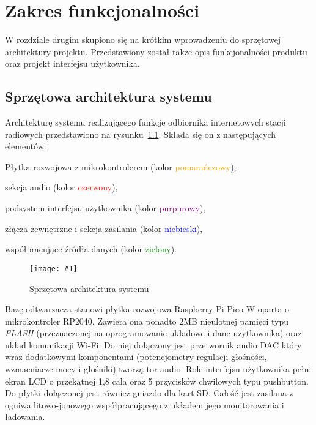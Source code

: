\documentclass[polish]{aghengthesis}
\let\tempone\itemize
\let\temptwo\enditemize
\renewenvironment{itemize}{\tempone\setlength{\itemsep}{0cm}}{\temptwo}
\newcommand{\imgint}[4]{
	\begin{figure}[{#4}]
		\centering
		\texttt{[image: \#1]}
		\caption{#2}
		\label{#1}
	\end{figure}
}
\newcommand{\imgh}[3]{\imgint{#1}{#2}{#3}{H}}
\begin{document}
\chapter{Zakres funkcjonalności}
	W rozdziale drugim skupiono się na krótkim wprowadzeniu do sprzętowej architektury projektu. Przedstawiony został także opis funkcjonalności produktu oraz projekt interfejsu użytkownika.\\
	
	\section{Sprzętowa architektura systemu}
			Architekturę systemu realizującego funkcje odbiornika internetowych stacji radiowych przedstawiono na rysunku~\ref{2/PicoRadio-hw-blocks}. Składa się on z następujących elementów:
			\begin{itemize}
				\item Płytka rozwojowa z mikrokontrolerem (kolor \textcolor{orange}{pomarańczowy}),
				\item sekcja audio (kolor \textcolor{red}{czerwony}),
				\item podsystem interfejsu użytkownika (kolor \textcolor{purple}{purpurowy}),
				\item złącza zewnętrzne i sekcja zasilania (kolor \textcolor{blue}{niebieski}),
				\item współpracujące źródła danych (kolor \textcolor{green}{zielony}).
			\end{itemize}
			
			\imgh{2/PicoRadio-hw-blocks}{Sprzętowa architektura systemu}{0.95}
			
			Bazę odtwarzacza stanowi płytka rozwojowa Raspberry Pi Pico W oparta o mikrokontroler RP2040. Zawiera ona ponadto 2MB nieulotnej pamięci typu \textit{FLASH} (przeznaczonej na oprogramowanie układowe i dane użytkownika) oraz układ komunikacji Wi-Fi. Do niej dołączony jest przetwornik audio DAC który wraz dodatkowymi komponentami (potencjometry regulacji głośności, wzmacniacze mocy i głośniki) tworzą tor audio. Role interfejsu użytkownika pełni ekran LCD o przekątnej 1,8 cala oraz 5 przycisków chwilowych typu pushbutton. Do płytki  dołączonej jest również gniazdo dla kart SD. Całość jest zasilana z ogniwa litowo-jonowego współpracującego z układem jego monitorowania i ładowania. 
			$ $\\
			
\end{document}
